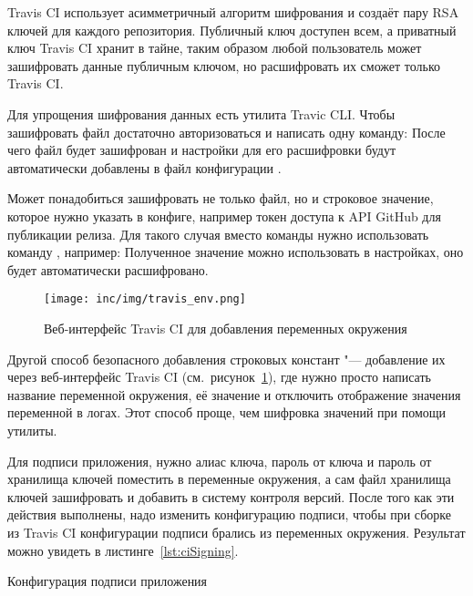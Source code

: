 Travis CI использует асимметричный алгоритм шифрования и создаёт пару RSA ключей для каждого репозитория.
Публичный ключ доступен всем, а приватный ключ Travis CI хранит в тайне, таким образом любой пользователь может зашифровать данные публичным ключом, но расшифровать их сможет только Travis CI\@.

Для упрощения шифрования данных есть утилита Travic CLI\@.
Чтобы зашифровать файл достаточно авторизоваться и написать одну команду:
После чего файл будет зашифрован и настройки для его расшифровки будут автоматически добавлены в файл конфигурации .

Может понадобиться зашифровать не только файл, но и строковое значение, которое нужно указать в конфиге, например токен доступа к API GitHub для публикации релиза.
Для такого случая вместо команды  нужно использовать команду , например:
Полученное значение можно использовать в настройках, оно будет автоматически расшифровано.

\begin{figure}[ht]
  \centering
  \texttt{[image: inc/img/travis\_env.png]}
  \caption{Веб-интерфейс Travis CI для добавления переменных окружения}
  \label{fig:travisEnv}
\end{figure}

Другой способ безопасного добавления строковых констант "--- добавление их через веб-интерфейс Travis CI (см.~рисунок~\ref{fig:travisEnv}), где нужно просто написать название переменной окружения, её значение и отключить отображение значения переменной в логах.
Этот способ проще, чем шифровка значений при помощи утилиты.

Для подписи приложения, нужно алиас ключа, пароль от ключа и пароль от хранилища ключей поместить в переменные окружения, а сам файл хранилища ключей зашифровать и добавить в систему контроля версий.
После того как эти действия выполнены, надо изменить конфигурацию подписи, чтобы при сборке из Travis CI конфигурации подписи брались из переменных окружения.
Результат можно увидеть в листинге~\ref{lst:ciSigning}.

\begin{listing}[h]
  \caption{Конфигурация подписи приложения}
  \label{lst:ciSigning}
\end{listing}

